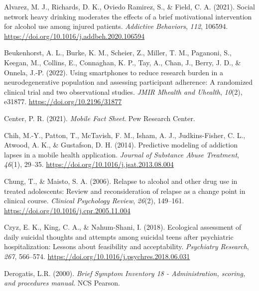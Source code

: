 \documentclass[
  letterpaper,
  DIV=11,
  numbers=noendperiod]{scrartcl}
\newlength{\cslhangindent}
\newenvironment{CSLReferences}[2] %
 {\begin{list}{}{%
  \setlength{\itemindent}{0pt}
  \setlength{\leftmargin}{0pt}
  \setlength{\parsep}{0pt}
  \ifodd #1
   \setlength{\leftmargin}{\cslhangindent}
   \setlength{\itemindent}{-1\cslhangindent}
  \fi
  \setlength{\itemsep}{#2\baselineskip}}}
 {\end{list}}
\begin{document}
\label{refs}
\begin{CSLReferences}{1}{0}
Alvarez, M. J., Richards, D. K., Oviedo Ramirez, S., \& Field, C. A.
(2021). Social network heavy drinking moderates the effects of a brief
motivational intervention for alcohol use among injured patients.
\emph{Addictive Behaviors}, \emph{112}, 106594.
\url{https://doi.org/10.1016/j.addbeh.2020.106594}

Beukenhorst, A. L., Burke, K. M., Scheier, Z., Miller, T. M., Paganoni,
S., Keegan, M., Collins, E., Connaghan, K. P., Tay, A., Chan, J., Berry,
J. D., \& Onnela, J.-P. (2022). Using smartphones to reduce research
burden in a neurodegenerative population and assessing participant
adherence: {A} randomized clinical trial and two observational studies.
\emph{JMIR Mhealth and Uhealth}, \emph{10}(2), e31877.
\url{https://doi.org/10.2196/31877}

Center, P. R. (2021). \emph{Mobile {Fact Sheet}}. Pew Research Center.

Chih, M.-Y., Patton, T., McTavish, F. M., Isham, A. J., Judkins-Fisher,
C. L., Atwood, A. K., \& Gustafson, D. H. (2014). Predictive modeling of
addiction lapses in a mobile health application. \emph{Journal of
Substance Abuse Treatment}, \emph{46}(1), 29--35.
\url{https://doi.org/10.1016/j.jsat.2013.08.004}

Chung, T., \& Maisto, S. A. (2006). Relapse to alcohol and other drug
use in treated adolescents: {Review} and reconsideration of relapse as a
change point in clinical course. \emph{Clinical Psychology Review},
\emph{26}(2), 149--161. \url{https://doi.org/10.1016/j.cpr.2005.11.004}

Czyz, E. K., King, C. A., \& Nahum-Shani, I. (2018). Ecological
assessment of daily suicidal thoughts and attempts among suicidal teens
after psychiatric hospitalization: {Lessons} about feasibility and
acceptability. \emph{Psychiatry Research}, \emph{267}, 566--574.
\url{https://doi.org/10.1016/j.psychres.2018.06.031}

Derogatis, L.R. (2000). \emph{Brief {Symptom Inventory} 18 -
{Administration}, scoring, and procedures manual}. NCS Pearson.


\end{CSLReferences}
\end{document}
